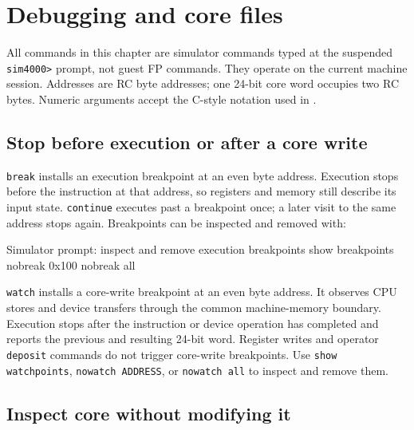 \chapter{Debugging and core files}\label{debugging-and-core-files}

All commands in this chapter are simulator commands typed at the suspended \passthrough{\lstinline!sim4000>!} prompt, not guest FP commands. They operate on the current machine session. Addresses are RC byte addresses; one 24-bit core word occupies two RC bytes. Numeric arguments accept the C-style notation used in .

\section{Stop before execution or after a core write}\label{stop-before-execution-or-after-a-core-write}

\passthrough{\lstinline!break!} installs an execution breakpoint at an even byte address. Execution stops before the instruction at that address, so registers and memory still describe its input state. \passthrough{\lstinline!continue!} executes past a breakpoint once; a later visit to the same address stops again. Breakpoints can be inspected and removed with:

\begin{commandexample}{Simulator prompt: inspect and remove execution breakpoints}
show breakpoints
nobreak 0x100
nobreak all
\end{commandexample}

\passthrough{\lstinline!watch!} installs a core-write breakpoint at an even byte address. It observes CPU stores and device transfers through the common machine-memory boundary. Execution stops after the instruction or device operation has completed and reports the previous and resulting 24-bit word. Register writes and operator \passthrough{\lstinline!deposit!} commands do not trigger core-write breakpoints. Use \passthrough{\lstinline!show watchpoints!}, \passthrough{\lstinline!nowatch ADDRESS!}, or \passthrough{\lstinline!nowatch all!} to inspect and remove them.

\section{Inspect core without modifying it}\label{inspect-core-without-modifying-it}

